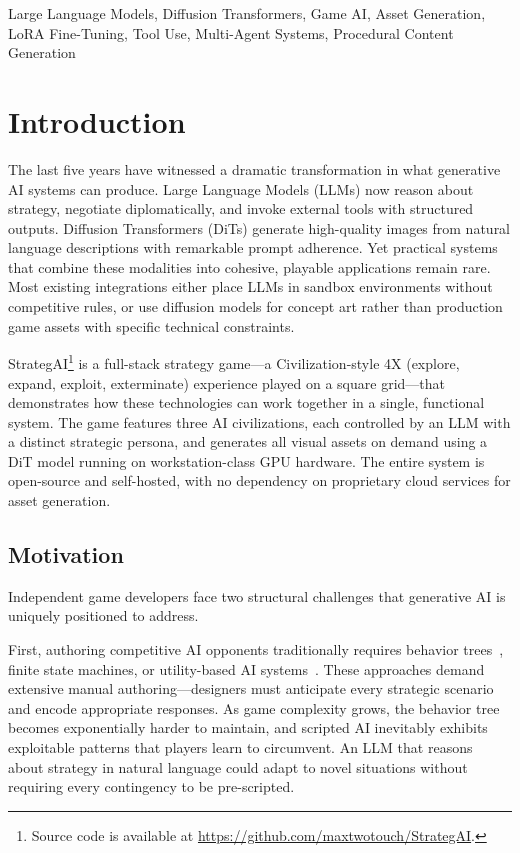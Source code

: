 \documentclass[conference]{IEEEtran}
\begin{document}
\begin{IEEEkeywords}
Large Language Models, Diffusion Transformers, Game AI, Asset Generation,
LoRA Fine-Tuning, Tool Use, Multi-Agent Systems, Procedural Content Generation
\end{IEEEkeywords}

\section{Introduction}
\label{sec:introduction}

The last five years have witnessed a dramatic transformation in what
generative AI systems can produce. Large Language Models (LLMs) now reason
about strategy, negotiate diplomatically, and invoke external tools with
structured outputs. Diffusion Transformers (DiTs) generate high-quality
images from natural language descriptions with remarkable prompt adherence.
Yet practical systems that combine these modalities into cohesive, playable
applications remain rare. Most existing integrations either place LLMs in
sandbox environments without competitive rules, or use diffusion models for
concept art rather than production game assets with specific technical
constraints.

StrategAI\footnote{Source code is available at \url{https://github.com/maxtwotouch/StrategAI}.} is a full-stack strategy game---a Civilization-style 4X
(explore, expand, exploit, exterminate) experience played on a square
grid---that demonstrates how these technologies can work together in a
single, functional system. The game features three AI civilizations, each
controlled by an LLM with a distinct strategic persona, and generates all
visual assets on demand using a DiT model running on workstation-class GPU
hardware. The entire system is open-source and self-hosted, with no
dependency on proprietary cloud services for asset generation.

\subsection{Motivation}
\label{sec:motivation}

Independent game developers face two structural challenges that generative
AI is uniquely positioned to address.

First, authoring competitive AI opponents traditionally requires behavior
trees~\cite{simpson2014behaviortrees}, finite state machines, or
utility-based AI systems~\cite{rabin2013gameaipro}. These approaches demand
extensive manual authoring---designers must anticipate every strategic
scenario and encode appropriate responses. As game complexity grows, the
behavior tree becomes exponentially harder to maintain, and scripted AI
inevitably exhibits exploitable patterns that players learn to circumvent.
An LLM that reasons about strategy in natural language could adapt to novel
situations without requiring every contingency to be pre-scripted.
\end{document}
